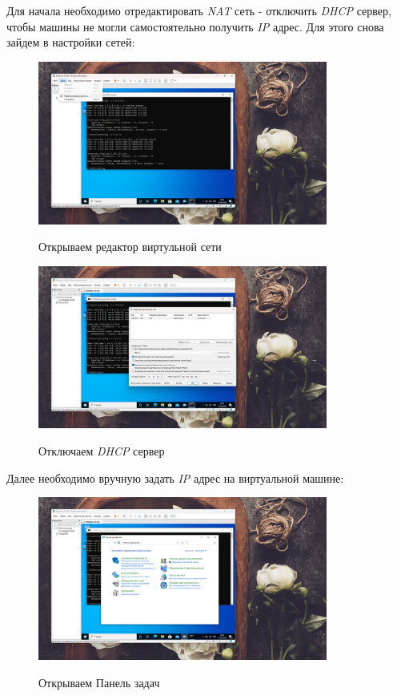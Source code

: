 \documentclass[a4paper]{article}
\begin{document}
  Для начала необходимо отредактировать \textit{NAT} сеть - отключить \textit{DHCP} сервер,
  чтобы машины не могли самостоятельно получить \textit{IP} адрес. Для этого снова
  зайдем в настройки сетей:

  \begin{figure}[H]
    \centering
    \includegraphics[width=0.85\textwidth]{06_00 (17)}
    \label{img:17}
    \caption{Открываем редактор виртульной сети}
  \end{figure}

  \begin{figure}[H]
    \centering
    \includegraphics[width=0.85\textwidth]{06_00 (18)}
    \label{img:18}
    \caption{Отключаем \textit{DHCP} сервер}
  \end{figure}
  
  Далее необходимо вручную задать \textit{IP} адрес на виртуальной машине:

  \begin{figure}[H]
    \centering
    \includegraphics[width=0.85\textwidth]{06_00 (19)}
    \label{img:19}
    \caption{Открываем Панель задач}
  \end{figure}
  
\end{document}
